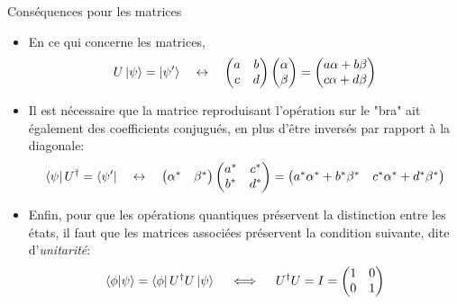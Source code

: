 \documentclass[aspectratio=169,12pt]{beamer}
\begin{document}
\begin{frame}{Conséquences pour les matrices}
    \begin{itemize}   
        \item En ce qui concerne les matrices,
        \begin{equation*}
            U \ket{\psi} = \ket{\psi'} \quad\leftrightarrow\quad 
            \begin{pmatrix}
                a & b \\
                c & d
            \end{pmatrix}
            \begin{pmatrix}
                \alpha \\
                \beta
            \end{pmatrix}
             =
            \begin{pmatrix}
                a\alpha + b\beta \\
                c\alpha + d\beta
            \end{pmatrix}
        \end{equation*}

        \item Il est nécessaire que la matrice reproduisant l'opération sur le "bra" ait également des coefficients conjugués, en plus d'être inversés par rapport à la diagonale:
        \begin{equation*}
            \bra{\psi} U^\dagger = \bra{\psi'} \quad\leftrightarrow\quad 
            \begin{pmatrix}
                \alpha^* & \beta^*
            \end{pmatrix}
            \begin{pmatrix}
                a^* & c^* \\
                b^* & d^*
            \end{pmatrix}
            =
            \begin{pmatrix}
                a^*\alpha^* + b^*\beta^* & c^*\alpha^* + d^*\beta^*
            \end{pmatrix}
        \end{equation*}

        \item Enfin, pour que les opérations quantiques préservent la distinction entre les états, il faut que les matrices associées préservent la condition suivante, dite d'\textit{unitarité}: 
        \begin{equation*}
            \braket{\phi}{\psi} = \bra{\phi} U^\dagger U \ket{\psi} \quad\iff\quad U^\dagger U = I
            =
            \begin{pmatrix}
                1 & 0 \\
                0 & 1
            \end{pmatrix}
        \end{equation*}
    \end{itemize}
\end{frame}
\end{document}
